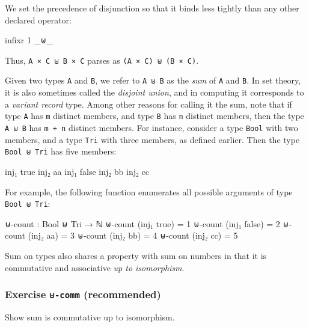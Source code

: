 We set the precedence of disjunction so that it binds less tightly than
any other declared operator:

\begin{fence}
\begin{code}
infixr 1 _⊎_
\end{code}
\end{fence}

Thus, \texttt{A\ ×\ C\ ⊎\ B\ ×\ C} parses as
\texttt{(A\ ×\ C)\ ⊎\ (B\ ×\ C)}.

Given two types \texttt{A} and \texttt{B}, we refer to \texttt{A\ ⊎\ B}
as the \emph{sum} of \texttt{A} and \texttt{B}. In set theory, it is
also sometimes called the \emph{disjoint union}, and in computing it
corresponds to a \emph{variant record} type. Among other reasons for
calling it the sum, note that if type \texttt{A} has \texttt{m} distinct
members, and type \texttt{B} has \texttt{n} distinct members, then the
type \texttt{A\ ⊎\ B} has \texttt{m\ +\ n} distinct members. For
instance, consider a type \texttt{Bool} with two members, and a type
\texttt{Tri} with three members, as defined earlier. Then the type
\texttt{Bool\ ⊎\ Tri} has five members:

\begin{myDisplay}
inj₁ true     inj₂ aa
inj₁ false    inj₂ bb
              inj₂ cc
\end{myDisplay}

For example, the following function enumerates all possible arguments of
type \texttt{Bool\ ⊎\ Tri}:

\begin{fence}
\begin{code}
⊎-count : Bool ⊎ Tri → ℕ
⊎-count (inj₁ true)   =  1
⊎-count (inj₁ false)  =  2
⊎-count (inj₂ aa)     =  3
⊎-count (inj₂ bb)     =  4
⊎-count (inj₂ cc)     =  5
\end{code}
\end{fence}

Sum on types also shares a property with sum on numbers in that it is
commutative and associative \emph{up to isomorphism}.

\hypertarget{exercise--comm-recommended}{%
\subsubsection{\texorpdfstring{Exercise \texttt{⊎-comm}
(recommended)}{Exercise ⊎-comm (recommended)}}\label{exercise--comm-recommended}}

Show sum is commutative up to isomorphism.

